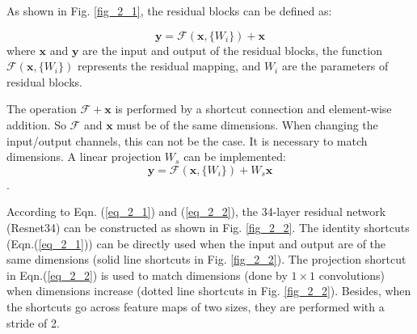 \documentclass[journal]{IEEEtran}
\begin{document}
As shown in Fig. \ref{fig_2_1}, the residual blocks can be defined as: 

\begin{equation}
\label{eq_2_1}
\mathbf{y} = \mathcal{F}(\mathbf{x}, \{W_i\}) + \mathbf{x}
\end{equation}
where $\mathbf{x}$ and $\mathbf{y}$ are the input and output of the residual blocks, the function $\mathcal{F}(\mathbf{x}, \{W_i\})$ represents the residual mapping, and $W_i$ are the parameters of residual blocks. 

The operation $\mathcal{F}+\mathbf{x}$ is performed by a shortcut connection and element-wise addition. So $\mathcal{F}$ and $\mathbf{x}$ must be of the same dimensions. When changing the input/output channels, this can not be the case. It is necessary to match dimensions. A linear projection $W_s$ can be implemented:
\begin{equation}
\label{eq_2_2}
\mathbf{y} = \mathcal{F}(\mathbf{x}, \{W_i\}) + W_s\mathbf{x}
\end{equation}.

According to Eqn. (\ref{eq_2_1}) and (\ref{eq_2_2}), the 34-layer residual network (Resnet34) can be constructed as shown in Fig. \ref{fig_2_2}. The identity shortcuts (Eqn.(\ref{eq_2_1})) can be directly used when the input and output are of the same dimensions (solid line shortcuts in Fig. \ref{fig_2_2}). The projection shortcut in Eqn.(\ref{eq_2_2}) is used to match dimensions (done by $1\times1$ convolutions) when dimensions increase (dotted line shortcuts in Fig. \ref{fig_2_2}). Besides, when the shortcuts go across feature maps of two sizes, they are performed with a stride of 2.
\end{document}
